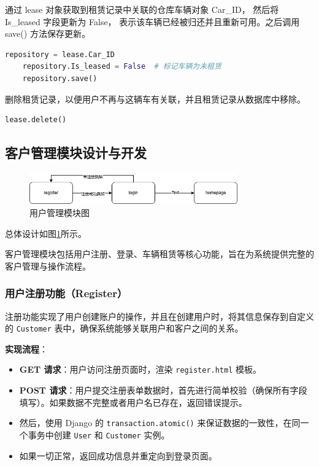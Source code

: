 \documentclass[UTF8,a4paper,12pt]{ctexart}
\begin{document}
通过 lease 对象获取到租赁记录中关联的仓库车辆对象 Car\_ID，
然后将 Is\_leased 字段更新为 False，
表示该车辆已经被归还并且重新可用。之后调用 save() 方法保存更新。

\begin{lstlisting}[language=Python]
    repository = lease.Car_ID
    repository.Is_leased = False  # 标记车辆为未租赁
    repository.save()
\end{lstlisting}

删除租赁记录，以便用户不再与这辆车有关联，并且租赁记录从数据库中移除。

\begin{lstlisting}[language=Python]
    lease.delete()
\end{lstlisting}

\subsection{客户管理模块设计与开发}

\begin{figure}[htbp]  %
    \centering  %
    \includegraphics[width=0.8\textwidth]{pic/user_management.png}
    \caption{用户管理模块图}  %
    \label{fig:um}  %
\end{figure}


总体设计如图\ref{fig:um}所示。

客户管理模块包括用户注册、登录、车辆租赁等核心功能，旨在为系统提供完整的客户管理与操作流程。

\subsubsection{用户注册功能（Register）}
注册功能实现了用户创建账户的操作，并且在创建用户时，将其信息保存到自定义的 \texttt{Customer} 表中，确保系统能够关联用户和客户之间的关系。

\textbf{实现流程}：
\begin{itemize}
    \item \textbf{GET 请求}：用户访问注册页面时，渲染 \texttt{register.html} 模板。
    \item \textbf{POST 请求}：用户提交注册表单数据时，首先进行简单校验（确保所有字段填写）。如果数据不完整或者用户名已存在，返回错误提示。
    \item 然后，使用 Django 的 \texttt{transaction.atomic()} 来保证数据的一致性，在同一个事务中创建 \texttt{User} 和 \texttt{Customer} 实例。
    \item 如果一切正常，返回成功信息并重定向到登录页面。
\end{itemize}
\end{document}
